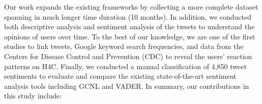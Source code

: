 \documentclass[conference]{IEEEtran}
\begin{document}
	\par
	Our work expands the existing frameworks by collecting a more complete dataset spanning in much longer time duration (10 months). In addition, we conducted both descriptive analysis and sentiment analysis of the tweets to understand the opinions of users over time. To the best of our knowledge, we are one of the first studies to link tweets, Google keyword search frequencies, and data from the Centers for Disease Control and Prevention (CDC) to reveal the users' reaction patterns on H4C. Finally, we conducted a manual classification of 4,850 tweet sentiments to evaluate and compare the existing state-of-the-art sentiment analysis tools including GCNL and VADER. In summary, our contributions in this study include:
\end{document}
